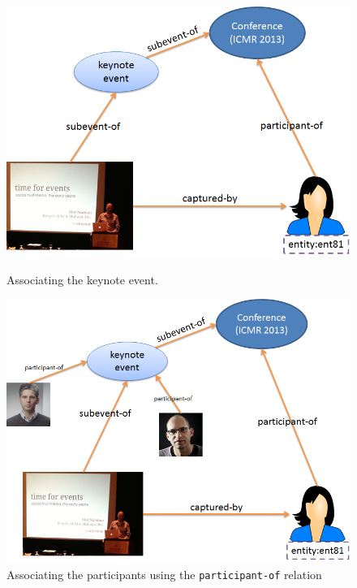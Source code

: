 \begin{figure}[t]
\begin{minipage}[b]{0.45\linewidth}
\label{fig:naaman-example-y}
\end{minipage}
\begin{minipage}[b]{0.48\linewidth}
\centering
\includegraphics[width=\textwidth]{media/chapter2/naaman-3.png}
\caption{Associating the keynote event.}
\label{fig:naaman-example-3}
\end{minipage}
\hspace{0.5cm}
\begin{minipage}[b]{0.45\linewidth}
\centering
\includegraphics[width=\textwidth]{media/chapter2/naaman-4.png}
\caption{Associating the participants using the \texttt{participant-of} relation}
\label{fig:naaman-example-4}
\end{minipage}
\end{figure}

